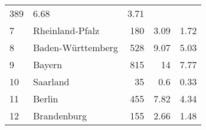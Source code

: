 \begin{longtable}{lXrrr}
       \num{389} &
       \num[round-mode=places,round-precision=2]{6,68} &
         \num[round-mode=places,round-precision=2]{3,71} \\

     7 &
     \multicolumn{1}{X}{ Rheinland-Pfalz   } &


       \num{180} &
       \num[round-mode=places,round-precision=2]{3,09} &
         \num[round-mode=places,round-precision=2]{1,72} \\

     8 &
     \multicolumn{1}{X}{ Baden-Württemberg   } &


       \num{528} &
       \num[round-mode=places,round-precision=2]{9,07} &
         \num[round-mode=places,round-precision=2]{5,03} \\

     9 &
     \multicolumn{1}{X}{ Bayern   } &


       \num{815} &
       \num[round-mode=places,round-precision=2]{14} &
         \num[round-mode=places,round-precision=2]{7,77} \\

     10 &
     \multicolumn{1}{X}{ Saarland   } &


       \num{35} &
       \num[round-mode=places,round-precision=2]{0,6} &
         \num[round-mode=places,round-precision=2]{0,33} \\

     11 &
     \multicolumn{1}{X}{ Berlin   } &


       \num{455} &
       \num[round-mode=places,round-precision=2]{7,82} &
         \num[round-mode=places,round-precision=2]{4,34} \\

     12 &
     \multicolumn{1}{X}{ Brandenburg   } &


       \num{155} &
       \num[round-mode=places,round-precision=2]{2,66} &
         \num[round-mode=places,round-precision=2]{1,48} \\


\end{longtable}
